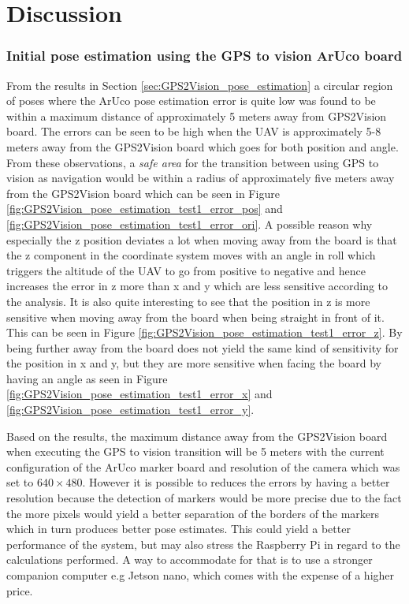 \documentclass[../Head/report.tex]{subfiles}
\begin{document}
\section{Discussion}

\subsubsection*{Initial pose estimation using the GPS to vision ArUco board}
From the results in Section \ref{sec:GPS2Vision_pose_estimation} a circular region of poses where the ArUco pose estimation error is quite low was found to be within a maximum distance of approximately 5 meters away from GPS2Vision board. The errors can be seen to be high when the UAV is approximately 5-8 meters away from the GPS2Vision board which goes for both position and angle. From these observations, a \textit{safe area} for the transition between using GPS to vision as navigation would be within a radius of approximately five meters away from the GPS2Vision board which can be seen in Figure \ref{fig:GPS2Vision_pose_estimation_test1_error_pos} and \ref{fig:GPS2Vision_pose_estimation_test1_error_ori}. A possible reason why especially the z position deviates a lot when moving away from the board is that the z component in the coordinate system moves with an angle in roll which triggers the altitude of the UAV to go from positive to negative and hence increases the error in z more than x and y which are less sensitive according to the analysis. It is also quite interesting to see that the position in z is more sensitive when moving away from the board when being straight in front of it. This can be seen in Figure \ref{fig:GPS2Vision_pose_estimation_test1_error_z}. By being further away from the board does not yield the same kind of sensitivity for the position in x and y, but they are more sensitive when facing the board by having an angle as seen in Figure \ref{fig:GPS2Vision_pose_estimation_test1_error_x} and \ref{fig:GPS2Vision_pose_estimation_test1_error_y}.   

Based on the results, the maximum distance away from the GPS2Vision board when executing the GPS to vision transition will be 5 meters with the current configuration of the ArUco marker board and resolution of the camera which was set to $640 \times 480$. However it is possible to reduces the errors by having a better resolution because the detection of markers would be more precise due to the fact the more pixels would yield a better separation of the borders of the markers which in turn produces better pose estimates. This could yield a better performance of the system, but may also stress the Raspberry Pi in regard to the calculations performed. A way to accommodate for that is to use a stronger companion computer e.g Jetson nano, which comes with the expense of a higher price.
\end{document}
